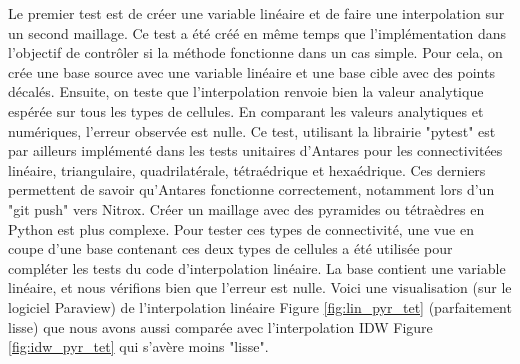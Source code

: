 Le premier test est de créer une variable linéaire et de faire une interpolation sur un second maillage. Ce test a été créé en même temps que l'implémentation dans l'objectif de contrôler si la méthode fonctionne dans un cas simple. Pour cela, on crée une base source avec une variable linéaire et une base cible avec des points décalés. Ensuite, on teste que l'interpolation renvoie bien la valeur analytique espérée sur tous les types de cellules. En comparant les valeurs analytiques et numériques, l'erreur observée est nulle. Ce test, utilisant la librairie "pytest" est par ailleurs implémenté dans les tests unitaires d'Antares pour les connectivitées linéaire, triangulaire, quadrilatérale, tétraédrique et hexaédrique. Ces derniers permettent de savoir qu'Antares fonctionne correctement, notamment lors d'un "git push" vers Nitrox.
Créer un maillage avec des pyramides ou tétraèdres en Python est plus complexe. Pour tester ces types de connectivité, une vue en coupe d'une base contenant ces deux types de cellules a été utilisée pour compléter les tests du code d'interpolation linéaire. La base contient une variable linéaire, et nous vérifions bien que l'erreur est nulle. Voici une visualisation (sur le logiciel Paraview) de l'interpolation linéaire Figure \ref{fig:lin_pyr_tet} (parfaitement lisse) que nous avons aussi comparée avec l'interpolation IDW Figure \ref{fig:idw_pyr_tet} qui s'avère moins "lisse".
